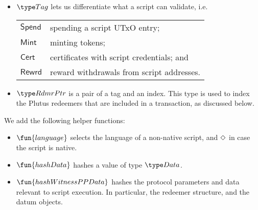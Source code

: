 \begin{itemize}
  \item $\Tag$ lets us differentiate what a script
  can validate, i.e. \\
  \begin{tabular}{l@{~to validate~}l}
  $\mathsf{Spend}$ & spending a script UTxO entry; \\
  $\mathsf{Mint}$ & minting tokens; \\
  $\mathsf{Cert}$  & certificates with script credentials; and  \\
  $\mathsf{Rewrd}$ & reward withdrawals from script addresses.
  \end{tabular}

  \item $\RdmrPtr$ is a pair of a tag and an index. This type is
  used to index the Plutus redeemers that are included in a transaction, as discussed
  below.

\end{itemize}

We add the following helper functions:

\begin{itemize}
  \item $\fun{language}$ selects the language of a non-native script, and $\Diamond$ in case
  the script is native.
  \item $\fun{hashData}$ hashes a value of type $\Data$.
  \item $\fun{hashWitnessPPData}$ hashes the protocol parameters and data relevant to script execution.
  In particular, the redeemer structure, and the datum objects.
\end{itemize}

